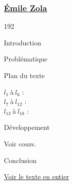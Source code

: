 \documentclass[12pt,a4paper]{article}
\begin{document}
				\subsubsection{\href{.extra/Bio/Zola.pdf}{\'Emile Zola}}
\begin{dingautolist}{192}

\item Introduction \par
\item Probl\'ematique \par
	\textcolor{blue}{}
\item Plan du texte \par
	$l_{1}~$\`a$~l_{6}$ :   		\\
    $l_{7}~$\`a$~l_{12}$ :  		\\
    $l_{13}~$\`a$~l_{18}$ : 


\item D\'eveloppement \par
        Voir cours.

\item Conclusion \par


\end{dingautolist}
\href{.extra/Textes/Germinal_Texte_2_12.pdf}{Voir le texte en entier}
\end{document}

